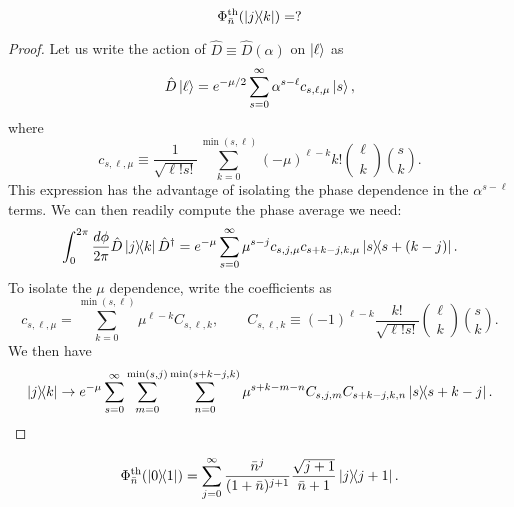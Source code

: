\documentclass[12pt]{report}
\begin{document}
\begin{prop}
	\begin{equation}
		\Phi_{\bar n}^{\rm th}(\ketbra{j}{k}) = ?
	\end{equation}
\end{prop}
\begin{proof}
	Let us write the action of $\hat D\equiv \hat D(\alpha)$ on $\ket\ell$ as
	\begin{equation}
		\hat D\ket \ell = e^{-\mu/2}\sum_{s=0}^\infty
		\alpha^{s-\ell} c_{s,\ell,\mu} \ket s,
	\end{equation}
	where
	\begin{equation}
		c_{s,\ell,\mu} \equiv \frac{1}{\sqrt{\ell! s!}}
		\sum_{k=0}^{\min(s,\ell)} (-\mu)^{\ell-k}
		k! \binom{\ell}{k} \binom{s}{k}.
	\end{equation}
	This expression has the advantage of isolating the phase dependence in the $\alpha^{s-\ell}$ terms. We can then readily compute the phase average we need:
	\begin{equation}
		\int_0^{2\pi} \frac{d\phi}{2\pi}
		\hat D\ketbra{j}{k} \hat D^\dagger =
		e^{-\mu} \sum_{s=0}^\infty \mu^{s-j}
		c_{s,j,\mu} c_{s+k-j,k,\mu}
		\ketbra{s}{s+(k-j)}.
	\end{equation}
	To isolate the $\mu$ dependence, write the coefficients as
	\begin{equation}
		c_{s,\ell,\mu} = \sum_{k=0}^{\min(s,\ell)} \mu^{\ell-k} C_{s,\ell,k},
		\qquad
		C_{s,\ell,k} \equiv (-1)^{\ell -k}
		\frac{k!}{\sqrt{\ell!s!}} \binom{\ell}{k} \binom{s}{k}.
	\end{equation}
	We then have
	\begin{equation}
		\ketbra{j}{k} \to 
		e^{-\mu} \sum_{s=0}^\infty
		\sum_{m=0}^{\min(s,j)} \sum_{n=0}^{\min(s+k-j,k)}
		\mu^{s+k - m - n} C_{s,j,m} C_{s+k-j,k,n}
		\ketbra{s}{s+k-j}.
	\end{equation}
\end{proof}

\begin{prop}\label{prop:thermalisation_applied_to_01}
	\begin{equation}
		\Phi^{\rm th}_{\bar n}(\ketbra{0}{1})
		= \sum_{j=0}^\infty
		\frac{\bar n^{j}}{(1+\bar n)^{j+1}}
		\frac{\sqrt{j+1}}{\bar n + 1}
		\ketbra{j}{j+1}.
	\end{equation}
\end{prop}
\end{document}

